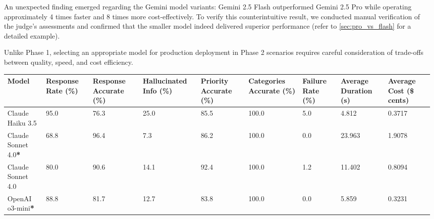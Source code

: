 An unexpected finding emerged regarding the Gemini model variants: Gemini 2.5 Flash outperformed Gemini 2.5 Pro while operating approximately 4 times faster and 8 times more cost-effectively.
To verify this counterintuitive result, we conducted manual verification of the judge's assessments and confirmed that the smaller model indeed delivered superior performance (refer to \cref{sec:pro_vs_flash} for a detailed example).

Unlike Phase 1, selecting an appropriate model for production deployment in Phase 2 scenarios requires careful consideration of trade-offs between quality, speed, and cost efficiency.

\begin{table}[h]
    \centering
    \footnotesize
    \begin{tabularx}{\textwidth}{Xp{1.1cm}p{1.25cm}p{1.6cm}p{1.3cm}p{1.3cm}p{1.3cm}p{1.3cm}p{1.3cm}}
        \toprule
        Model                            & Response \newline Rate (\%) & Response \newline Accurate (\%) & Hallucinated Info (\%) & Priority Accurate (\%) & Categories Accurate (\%) & Failure Rate (\%) & Average \newline Duration (s) & Average Cost \newline (\$ cents) \\
        \midrule
        \rowcolor[gray]{0.9}
        Claude Haiku 3.5                 & 95.0                        & 76.3                            & 25.0                   & 85.5                   & 100.0                    & 5.0               & 4.812                         & 0.3717                           \\
        Claude Sonnet 4.0\textbf{*}      & 68.8                        & 96.4                            & 7.3                    & 86.2                   & 100.0                    & 0.0               & 23.963                        & 1.9078                           \\
        \rowcolor[gray]{0.9}
        Claude Sonnet 4.0                & 80.0                        & 90.6                            & 14.1                   & 92.4                   & 100.0                    & 1.2               & 11.402                        & 0.8094                           \\
        OpenAI o3-mini\textbf{*}         & 88.8                        & 81.7                            & 12.7                   & 83.8                   & 100.0                    & 0.0               & 5.859                         & 0.3231                           \\

\end{tabularx}
\end{table}
